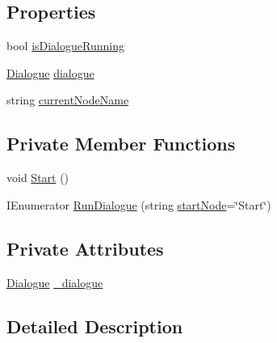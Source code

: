 \subsection*{Properties}
\begin{DoxyCompactItemize}
\item 
bool \hyperlink{a00051_a9eb0fd7b600a4667595042832af1d655}{is\-Dialogue\-Running}
\item 
\hyperlink{a00050}{Dialogue} \hyperlink{a00051_a4f9712a847ca6d53ec8d2dd64dfcffd8}{dialogue}
\item 
string \hyperlink{a00051_a8589c66769e89906eaff3c2263bdad5d}{current\-Node\-Name}
\end{DoxyCompactItemize}
\subsection*{Private Member Functions}
\begin{DoxyCompactItemize}
\item 
void \hyperlink{a00051_a18eb3750a0161dbfc20d7eb39e151b6c}{Start} ()
\item 
I\-Enumerator \hyperlink{a00051_adf4e816844b7d9ab4ed99265fd3f3ea9}{Run\-Dialogue} (string \hyperlink{a00051_a61c92b8d2228d01d8ac123b73bbb41a0}{start\-Node}=\char`\"{}Start\char`\"{})
\end{DoxyCompactItemize}
\subsection*{Private Attributes}
\begin{DoxyCompactItemize}
\item 
\hyperlink{a00050}{Dialogue} \hyperlink{a00051_a822055443227d3b76c6a8fb509812820}{\-\_\-dialogue}
\end{DoxyCompactItemize}


\subsection{Detailed Description}


